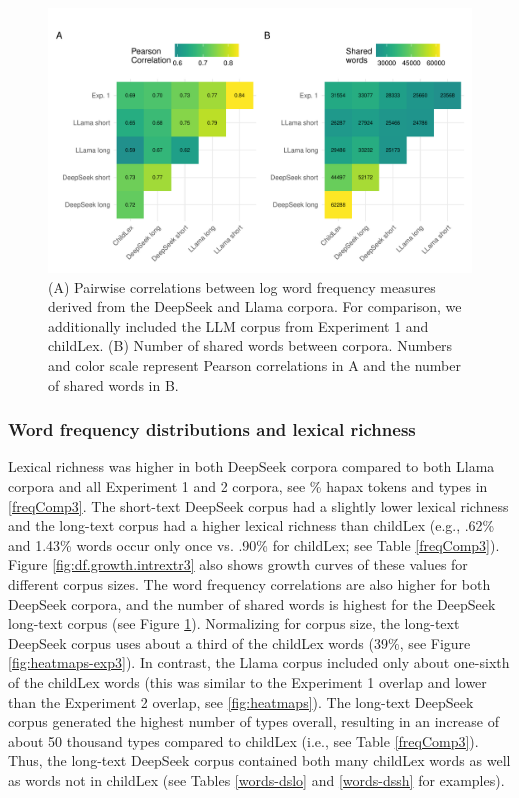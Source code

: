 \documentclass[manuscript]{stjour}
\begin{document}
\begin{figure}[!htbp]
  \centerline{
    \includegraphics[width=1.1\textwidth]{figures/combined_plotc_exp3.pdf}}
    \caption{(A) Pairwise correlations between log word frequency measures derived from the DeepSeek and Llama corpora. For comparison, we additionally included the LLM corpus from Experiment 1 and childLex. (B) Number of shared words between corpora. Numbers and color scale represent Pearson correlations in A and the number of shared words in B.}
    \label{fig:combined_plotc_exp3}
\end{figure}


\subsubsection*{Word frequency distributions and lexical richness}

Lexical richness was higher in both DeepSeek corpora compared to both Llama corpora and all Experiment 1 and 2 corpora, see \% hapax tokens and types in \ref{freqComp3}. The short-text DeepSeek corpus had a slightly lower lexical richness and the long-text corpus had a higher lexical richness than childLex (e.g., .62\% and 1.43\% words occur only once vs. .90\% for childLex; see Table \ref{freqComp3}). Figure \ref{fig:df.growth.intrextr3} also shows growth curves of these values for different corpus sizes. The word frequency correlations are also higher for both DeepSeek corpora, and the number of shared words is highest for the DeepSeek long-text corpus (see Figure \ref{fig:combined_plotc_exp3}). Normalizing for corpus size, the long-text DeepSeek corpus uses about a third of the childLex words (39\%, see Figure \ref{fig:heatmaps-exp3}). In contrast, the Llama corpus included only about one-sixth of the childLex words (this was similar to the Experiment 1 overlap and lower than the Experiment 2 overlap, see \ref{fig:heatmaps}). The long-text DeepSeek corpus generated the highest number of types overall, resulting in an increase of about 50 thousand types compared to childLex (i.e., see Table  \ref{freqComp3}). Thus, the long-text DeepSeek corpus contained both many childLex words as well as words not in childLex (see Tables \ref{words-dslo} and \ref{words-dssh} for examples). 
\end{document}
